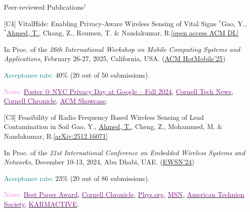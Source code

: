 \documentclass{resume} %
\begin{document}
\begin{rSection}{Peer-reviewed Publications$^\dagger$}
\begin{rPublicationSubsection}{[C4] VitalHide: Enabling Privacy-Aware Wireless Sensing of Vital Signs}{}
{$^*$Gao, Y., $^*$\underline{Ahmed, T.}, Chang, Z., Roumen, T. \& Nandakumar, R.}{\href{https://dl.acm.org/doi/10.1145/3708468.3711880}{[open access ACM DL]}}
\item In Proc. of the \textit{26th International Workshop on Mobile Computing Systems and Applications}, February 26-27, 2025, California, USA. (\href{http://www.hotmobile.org/2025/}{ACM HotMobile'25}) \label{pub:C4}
\item \textcolor{teal}{Acceptance rate:} 40\% (20 out of 50 submissions).
\item \textcolor{violet}{News:} \href{https://rsvp.withgoogle.com/events/nyc-privacy-day-at-google-fall-2024}{\textcolor{purple}{Poster @ NYC Privacy Day at Google -- Fall 2024}}, \href{https://tech.cornell.edu/news/vitalhide/}{\textcolor{purple}{Cornell Tech News}}, \href{https://news.cornell.edu/stories/2025/06/vitalhide-puts-privacy-first-age-wireless-health-monitoring}{\textcolor{purple}{Cornell Chronicle}}, \href{https://www.growkudos.com/publications/10.1145%25252F3708468.3711880/reader}{\textcolor{purple}{ACM Showcase}}. 
\end{rPublicationSubsection}


\begin{rPublicationSubsection}{[C3] Feasibility of Radio Frequency Based Wireless Sensing of Lead Contamination in Soil}{}
{Gao, Y., \underline{Ahmed, T.}, Cheng, Z., Mohammed, M. \& Nandakumar, R.}{\href{https://arxiv.org/pdf/2512.16071}{[arXiv:2512.16071]}}
\item In Proc. of the \textit{21st International Conference on Embedded Wireless Systems and Networks}, December 10-13, 2024, Abu Dhabi, UAE. (\href{https://ewsn24.tii.ae/}{EWSN'24})
\item \textcolor{teal}{Acceptance rate:} 23\% (20 out of 86 submissions). 

\item \textcolor{violet}{News:} \href{https://ewsn24.tii.ae/awards.html}{\textcolor{purple}{Best Paper Award}}, \href{https://news.cornell.edu/stories/2025/01/new-devices-radio-waves-reveal-lead-contamination-soil}{\textcolor{purple}{Cornell Chronicle}}, \href{https://phys.org/news/2025-01-device-radio-reveal-contamination-soil.html}{\textcolor{purple}{Phys.org}}, \href{https://www.msn.com/en-us/news/technology/new-device-s-radio-waves-reveal-lead-contamination-in-soil/ar-AA1wRqyO}{\textcolor{purple}{MSN}}, \href{https://ats.org/ats-news/new-devices-radio-waves-reveal-lead-contamination-in-soil/}{\textcolor{purple}{American Technion Society}}, \href{https://www.karmactive.com/soilscanner-affordable-device-detects-lead-in-urban-gardens/}{\textcolor{purple}{KARMACTIVE}}. 
\end{rPublicationSubsection}


\end{rSection}
\end{document}
